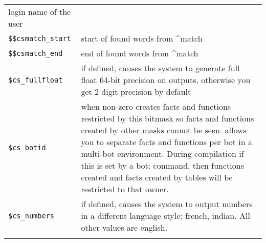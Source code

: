 \documentclass[]{article}
\begin{document}
\begin{longtable}[]{@{}ll@{}}
\begin{minipage}[t]{0.10\columnwidth}
login name of the user\strut
\end{minipage}\tabularnewline
\begin{minipage}[t]{0.26\columnwidth}\raggedright\strut
\texttt{\$\$csmatch\_start}\strut
\end{minipage} & \begin{minipage}[t]{0.10\columnwidth}\raggedright\strut
start of found words from \^{}match\strut
\end{minipage}\tabularnewline
\begin{minipage}[t]{0.26\columnwidth}\raggedright\strut
\texttt{\$\$csmatch\_end}\strut
\end{minipage} & \begin{minipage}[t]{0.10\columnwidth}\raggedright\strut
end of found words from \^{}match\strut
\end{minipage}\tabularnewline
\begin{minipage}[t]{0.26\columnwidth}\raggedright\strut
\texttt{\$cs\_fullfloat}\strut
\end{minipage} & \begin{minipage}[t]{0.10\columnwidth}\raggedright\strut
if defined, causes the system to generate full float 64-bit precision on
outputs, otherwise you get 2 digit precision by default\strut
\end{minipage}\tabularnewline
\begin{minipage}[t]{0.26\columnwidth}\raggedright\strut
\texttt{\$cs\_botid}\strut
\end{minipage} & \begin{minipage}[t]{0.10\columnwidth}\raggedright\strut
when non-zero creates facts and functions restricted by this bitmask so
facts and functions created by other masks cannot be seen. allows you to
separate facts and functions per bot in a multi-bot environment. During
compilation if this is set by a bot: command, then functions created and
facts created by tables will be restricted to that owner.\strut
\end{minipage}\tabularnewline
\begin{minipage}[t]{0.26\columnwidth}\raggedright\strut
\texttt{\$cs\_numbers}\strut
\end{minipage} & \begin{minipage}[t]{0.10\columnwidth}\raggedright\strut
if defined, causes the system to output numbers in a different language
style: french, indian. All other values are english.\strut
\end{minipage}\tabularnewline
\begin{minipage}[t]{0.26\columnwidth}\raggedright\strut

\end{minipage}
\end{longtable}
\end{document}
